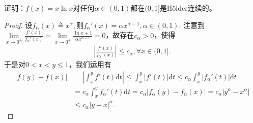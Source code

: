 \documentclass[../../main.tex]{subfiles}%
\begin{document}
\begin{example}
证明：$f(x)=x\ln x$对任何$\alpha\in(0,1)$都在$(0,1]$是Hölder连续的。
\end{example}
\begin{proof}
设$
f_\alpha(x)\triangleq x^\alpha,$则$ f_\alpha'(x)=\alpha x^{\alpha-1},\alpha\in(0,1).$
注意到$\lim\limits_{x\to 0^+}\frac{f'(x)}{f_\alpha'(x)}=\lim\limits_{x\to 0^+}\frac{\ln x + 1}{\alpha x^{\alpha-1}}=0$，故存在$c_\alpha>0$，使得
\begin{align*}
\left|\frac{f'(x)}{f_\alpha'(x)}\right|\leqslant c_\alpha,\forall x\in(0,1].
\end{align*}
于是对$0<x<y\leqslant1$，我们运用有
\begin{align*}
|f(y)-f(x)|&=\left| \int_x^y f'(t)\mathrm{d}t \right|\leqslant \int_x^y |f'(t)|\mathrm{d}t\leqslant c_{\alpha}\int_x^y |f_\alpha'(t)|\mathrm{d}t \\
&=c_{\alpha}\int_x^y f_\alpha'(t)\mathrm{d}t=c_{\alpha}|f_\alpha(y)-f_\alpha(x)|=c_{\alpha}\left| y^{\alpha}-x^{\alpha} \right| \\
&\leqslant c_{\alpha}|y-x|^{\alpha}.
\end{align*}
\end{proof}
\end{document}
